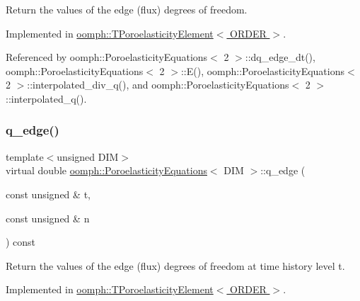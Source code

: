 Return the values of the edge (flux) degrees of freedom. 



Implemented in \hyperlink{classoomph_1_1TPoroelasticityElement_a009eca6ca9d19912f3523605190cccb5}{oomph\+::\+T\+Poroelasticity\+Element$<$ O\+R\+D\+E\+R $>$}.



Referenced by oomph\+::\+Poroelasticity\+Equations$<$ 2 $>$\+::dq\+\_\+edge\+\_\+dt(), oomph\+::\+Poroelasticity\+Equations$<$ 2 $>$\+::\+E(), oomph\+::\+Poroelasticity\+Equations$<$ 2 $>$\+::interpolated\+\_\+div\+\_\+q(), and oomph\+::\+Poroelasticity\+Equations$<$ 2 $>$\+::interpolated\+\_\+q().

\mbox{\label{classoomph_1_1PoroelasticityEquations_aed66c1aeaa3cadb53537c5a74684ddec}} 
\subsubsection{\texorpdfstring{q\+\_\+edge()}{q\_edge()}\hspace{0.1cm}{\footnotesize\ttfamily [2/2]}}
{\footnotesize\ttfamily template$<$unsigned D\+IM$>$ \\
virtual double \hyperlink{classoomph_1_1PoroelasticityEquations}{oomph\+::\+Poroelasticity\+Equations}$<$ D\+IM $>$\+::q\+\_\+edge (\begin{DoxyParamCaption}\item[{const unsigned \&}]{t,  }\item[{const unsigned \&}]{n }\end{DoxyParamCaption}) const\hspace{0.3cm}{\ttfamily [pure virtual]}}



Return the values of the edge (flux) degrees of freedom at time history level t. 



Implemented in \hyperlink{classoomph_1_1TPoroelasticityElement_aafc2bfff42ab8d5e6b6c4759e2929f81}{oomph\+::\+T\+Poroelasticity\+Element$<$ O\+R\+D\+E\+R $>$}.

\mbox{\label{classoomph_1_1PoroelasticityEquations_abe5fd6d829fcefd5760c8802f7887631}} 
